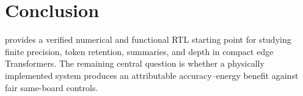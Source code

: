 \section{Conclusion}
\label{sec:conclusion}
\projectname{} provides a verified numerical and functional RTL starting point
for studying finite precision, token retention, summaries, and depth in compact
edge Transformers. The remaining central question is whether a physically
implemented system produces an attributable accuracy--energy benefit against
fair same-board controls.

